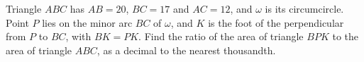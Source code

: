 Triangle $ABC$ has $AB=20$, $BC=17$ and $AC=12$, and $\omega$ is its circumcircle. Point $P$ lies on the minor arc $BC$ of $\omega$, and $K$ is the foot of the perpendicular from $P$ to $BC$, with $BK=PK$. Find the ratio of the area of triangle $BPK$ to the area of triangle $ABC$, as a decimal to the nearest thousandth.
